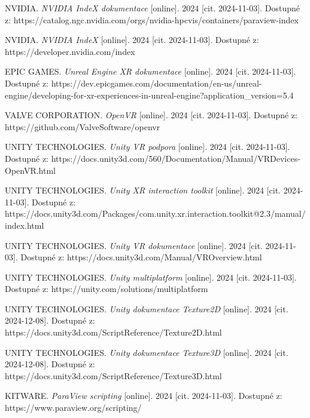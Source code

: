 \documentclass[a4paper,oneside,12pt]{book}
\begin{document}
\begin{thebibliography}{99}
NVIDIA. \textit{NVIDIA IndeX dokumentace} [online]. 2024 [cit. 2024-11-03]. Dostupné z: https://catalog.ngc.nvidia.com/orgs/nvidia-hpcvis/containers/paraview-index

NVIDIA. \textit{NVIDIA IndeX} [online]. 2024 [cit. 2024-11-03]. Dostupné z: https://developer.nvidia.com/index

EPIC GAMES. \textit{Unreal Engine XR dokumentace} [online]. 2024 [cit. 2024-11-03]. Dostupné z: https://dev.epicgames.com/documentation/en-us/unreal-engine/developing-for-xr-experiences-in-unreal-engine?application\_version=5.4

VALVE CORPORATION. \textit{OpenVR} [online]. 2024 [cit. 2024-11-03]. Dostupné z: https://github.com/ValveSoftware/openvr


UNITY TECHNOLOGIES. \textit{Unity VR podpora} [online]. 2024 [cit. 2024-11-03]. Dostupné z: https://docs.unity3d.com/560/Documentation/Manual/VRDevices-OpenVR.html


UNITY TECHNOLOGIES. \textit{Unity XR interaction toolkit} [online]. 2024 [cit. 2024-11-03]. Dostupné z: https://docs.unity3d.com/Packages/com.unity.xr.interaction.toolkit@2.3/manual/index.html

UNITY TECHNOLOGIES. \textit{Unity VR dokumentace} [online]. 2024 [cit. 2024-11-03]. Dostupné z: https://docs.unity3d.com/Manual/VROverview.html

UNITY TECHNOLOGIES. \textit{Unity multiplatform} [online]. 2024 [cit. 2024-11-03]. Dostupné z: https://unity.com/solutions/multiplatform

UNITY TECHNOLOGIES. \textit{Unity dokumentace Texture2D} [online]. 2024 [cit. 2024-12-08]. Dostupné z: https://docs.unity3d.com/ScriptReference/Texture2D.html

UNITY TECHNOLOGIES. \textit{Unity dokumentace Texture3D} [online]. 2024 [cit. 2024-12-08]. Dostupné z: https://docs.unity3d.com/ScriptReference/Texture3D.html

KITWARE. \textit{ParaView scripting} [online]. 2024 [cit. 2024-11-03]. Dostupné z: https://www.paraview.org/scripting/
\end{thebibliography}
\end{document}

